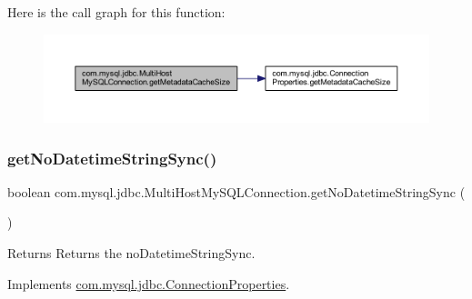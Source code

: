 Here is the call graph for this function\+:
\nopagebreak
\begin{figure}[H]
\begin{center}
\leavevmode
\includegraphics[width=350pt]{classcom_1_1mysql_1_1jdbc_1_1_multi_host_my_s_q_l_connection_a7e4ed369659b3dc767551e7491496cfa_cgraph}
\end{center}
\end{figure}
\mbox{\label{classcom_1_1mysql_1_1jdbc_1_1_multi_host_my_s_q_l_connection_a6b3c51428efc616f8a08b2e5c70b75cd}} 
\subsubsection{\texorpdfstring{get\+No\+Datetime\+String\+Sync()}{getNoDatetimeStringSync()}}
{\footnotesize\ttfamily boolean com.\+mysql.\+jdbc.\+Multi\+Host\+My\+S\+Q\+L\+Connection.\+get\+No\+Datetime\+String\+Sync (\begin{DoxyParamCaption}{ }\end{DoxyParamCaption})}

\begin{DoxyReturn}{Returns}
Returns the no\+Datetime\+String\+Sync. 
\end{DoxyReturn}


Implements \mbox{\hyperlink{interfacecom_1_1mysql_1_1jdbc_1_1_connection_properties_aa2bc32d658c0dbe027280d159da5dd49}{com.\+mysql.\+jdbc.\+Connection\+Properties}}.

